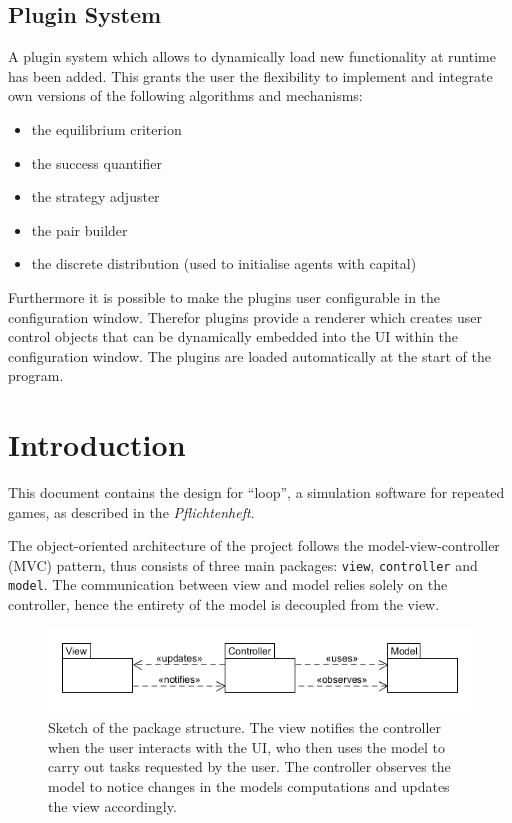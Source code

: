 \documentclass[parskip=full,11pt]{scrartcl}
\begin{document}
\subsection{Plugin System}

A plugin system which allows to dynamically load new functionality at runtime has been added. This grants the user the flexibility to implement and integrate own versions of the following algorithms and mechanisms:
\begin{itemize} \itemsep -10pt
	\item the equilibrium criterion
	\item the success quantifier
	\item the strategy adjuster
	\item the pair builder
	\item the discrete distribution (used to initialise agents with capital)
\end{itemize}

Furthermore it is possible to make the plugins user configurable in the configuration window. Therefor plugins provide a renderer which creates user control objects that can be dynamically embedded into the UI within the configuration window. The plugins are loaded automatically at the start of the program.

\section{Introduction}
This document contains the design for \enquote{loop}, a simulation software for repeated games, as described in the \textit{Pflichtenheft}.

The object-oriented architecture of the project follows the model-view-controller (MVC) pattern, thus consists of three main packages: \texttt{view}, \texttt{controller} and \texttt{model}. The communication between view and model relies solely on the controller, hence the entirety of the model is decoupled from the view.

\begin{figure}[h]
	\centering
	\includegraphics[width=0.7\linewidth]{images/package_diagram_overview.png}
	\caption{Sketch of the package structure. The view notifies the controller when the user interacts with the UI, who then uses the model to carry out tasks requested by the user. The controller observes the model to notice changes in the models computations and updates the view accordingly.}
	\label{package_overview}
\end{figure}
\end{document}

